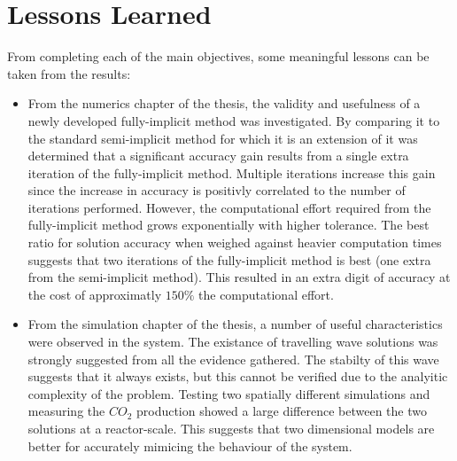 \section{Lessons Learned}

From completing each of the main objectives, some meaningful lessons can be taken from the results:

\begin{itemize}
  \item From the numerics chapter of the thesis, the validity and usefulness of a newly developed fully-implicit method was investigated.
    By comparing it to the standard semi-implicit method for which it is an extension of it was determined that a significant accuracy gain results from a single extra iteration of the fully-implicit method.
    Multiple iterations increase this gain since the increase in accuracy is positivly correlated to the number of iterations performed.
    However, the computational effort required from the fully-implicit method grows exponentially with higher tolerance.
    The best ratio for solution accuracy when weighed against heavier computation times suggests that two iterations of the fully-implicit method is best (one extra from the semi-implicit method).
    This resulted in an extra digit of accuracy at the cost of approximatly $150\%$ the computational effort.
  \item From the simulation chapter of the thesis, a number of useful characteristics were observed in the system.
    The existance of travelling wave solutions was strongly suggested from all the evidence gathered.
    The stabilty of this wave suggests that it always exists, but this cannot be verified due to the analyitic complexity of the problem.
    Testing two spatially different simulations and measuring the $CO_2$ production showed a large difference between the two solutions at a reactor-scale.
    This suggests that two dimensional models are better for accurately mimicing the behaviour of the system.
\end{itemize}
